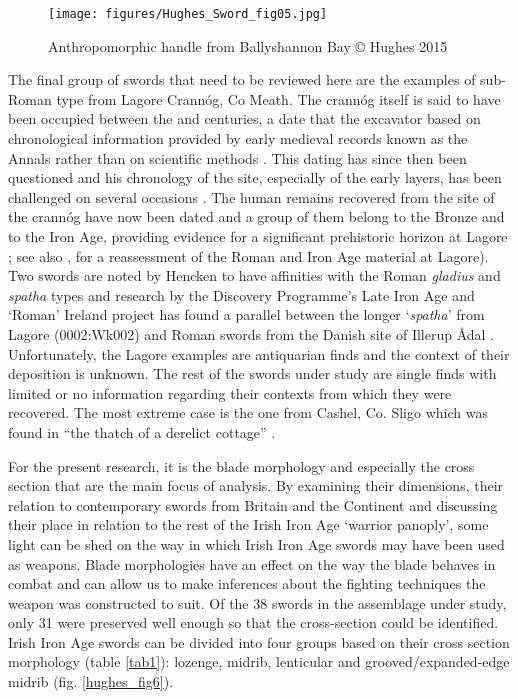 \begin{wrapfigure}{O}{.5\textwidth}
\texttt{[image: figures/Hughes\_Sword\_fig05.jpg]} 
\caption{Anthropomorphic handle from Ballyshannon Bay © Hughes 2015}
\label{hughes_fig5}
\end{wrapfigure}
The final group of swords that need to be reviewed here are the examples of sub-Roman type from Lagore Crannóg, Co Meath. 
The crannóg itself is said to have been occupied between the  and  centuries, 
a date that the excavator based on chronological information provided by
 early medieval records known as the Annals rather than on scientific methods \parencite[6]{Hencken1950}. 
 This dating has since then been questioned and his chronology of the site, especially of the early layers, 
 has been challenged on several occasions \parencites(e.g.)(){Lynn1985-6}[77\psqq]{CahillWilson2010}.  
 The human remains recovered from the site of the crannóg have now been dated and a group of them belong to the Bronze and to the Iron Age, 
 providing evidence for a significant prehistoric horizon at Lagore 
 \parencite[32\psqq]{Carty2013}; see also \textcite{Gugliemi}, for a reassessment of the Roman and Iron Age material at Lagore). 
 Two swords are noted by Hencken to have affinities with the Roman \emph{gladius} and \emph{spatha} types \parencite[91; sword numbers 0002:Wk002 and 0003:Wk003, appendix 1]{Hencken1950}
  and research by the Discovery Programme’s Late Iron Age and ‘Roman’ Ireland project has found a parallel between the longer ‘\emph{spatha}’ from Lagore (0002:Wk002) and Roman swords from the Danish site of Illerup Ådal \parencite[28]{CahillWilson2014}. 
  Unfortunately, the Lagore examples are antiquarian finds and the context of their deposition is unknown.
The rest of the swords under study are single finds with limited or no information regarding their contexts from which they were recovered. 
The most extreme case is the one from Cashel, Co. Sligo which was found in “the thatch of a derelict cottage” \parencite[92]{Raftery1983}.

For the present research, it is the blade morphology and especially the cross section that are the main focus of analysis. 
By examining their dimensions, their relation to contemporary swords from Britain and the Continent and discussing their place in relation to the rest of the Irish Iron Age ‘warrior panoply’, some light can be shed on the way in which Irish Iron Age swords may have been used as weapons. 
Blade morphologies have an effect on the way the blade behaves in combat and can allow us to make inferences about the fighting techniques the weapon was constructed to suit. 
Of the 38 swords in the assemblage under study, only 31 were preserved well enough so that the cross-section could be identified. 
Irish Iron Age swords can be divided into four groups based on their cross section morphology (table \ref{tab1}): lozenge, midrib, lenticular and grooved/expanded-edge midrib (fig. \ref{hughes_fig6}). 




